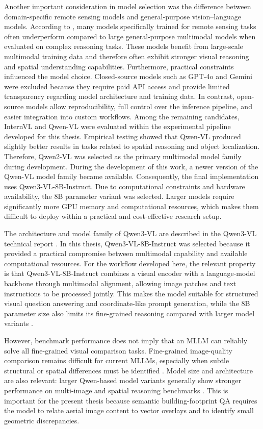 Another important consideration in model selection was the difference between domain-specific remote sensing models and general-purpose vision–language models. According to \cite{an2025choicebenchmarkingremotesensing}, many models specifically trained for remote sensing tasks often underperform compared to large general-purpose multimodal models when evaluated on complex reasoning tasks. These models benefit from large-scale multimodal training data and therefore often exhibit stronger visual reasoning and spatial understanding capabilities. Furthermore, practical constraints influenced the model choice. Closed-source models such as GPT-4o and Gemini were excluded because they require paid API access and provide limited transparency regarding model architecture and training data. In contrast, open-source models allow reproducibility, full control over the inference pipeline, and easier integration into custom workflows. Among the remaining candidates, InternVL and Qwen-VL were evaluated within the experimental pipeline developed for this thesis. Empirical testing showed that Qwen-VL produced slightly better results in tasks related to spatial reasoning and object localization. Therefore, Qwen2-VL was selected as the primary multimodal model family during development. During the development of this work, a newer version of the Qwen-VL model family became available. Consequently, the final implementation uses Qwen3-VL-8B-Instruct. Due to computational constraints and hardware availability, the 8B parameter variant was selected. Larger models require significantly more GPU memory and computational resources, which makes them difficult to deploy within a practical and cost-effective research setup.

The architecture and model family of Qwen3-VL are described in the Qwen3-VL technical report \citep{bai2025qwen3vltechnicalreport}. In this thesis, Qwen3-VL-8B-Instruct was selected because it provided a practical compromise between multimodal capability and available computational resources. For the workflow developed here, the relevant property is that Qwen3-VL-8B-Instruct combines a visual encoder with a language-model backbone through multimodal alignment, allowing image patches and text instructions to be processed jointly. This makes the model suitable for structured visual question answering and coordinate-like prompt generation, while the 8B parameter size also limits its fine-grained reasoning compared with larger model variants \citep{bai2025qwen3vltechnicalreport}.

However, benchmark performance does not imply that an MLLM can reliably solve all fine-grained visual comparison tasks. Fine-grained image-quality comparison remains difficult for current MLLMs, especially when subtle structural or spatial differences must be identified \citep{wu2024comprehensive}. Model size and architecture are also relevant: larger Qwen-based model variants generally show stronger performance on multi-image and spatial reasoning benchmarks \citep{li2024llavanextinterleavetacklingmultiimagevideo}. This is important for the present thesis because semantic building-footprint QA requires the model to relate aerial image content to vector overlays and to identify small geometric discrepancies.

